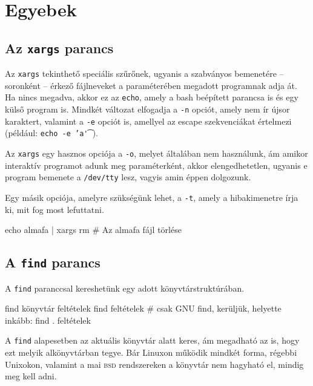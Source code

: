 \chapter{Egyebek}%
\label{cha:others}




\section{Az \texttt{xargs} parancs}

Az \texttt{xargs} tekinthető speciális szűrőnek, ugyanis a szabványos bemenetére
-- soronként -- érkező fájlneveket a paraméterében megadott programnak adja
át. Ha nincs megadva, akkor ez az \texttt{echo}, amely a bash beépített parancsa
is és egy külső program is. Mindkét változat elfogadja a \texttt{-n} opciót,
amely nem ír újsor karaktert, valamint a \texttt{-e} opciót is, amellyel az
escape szekvenciákat értelmezi (például: \texttt{echo -e 'a\t'}).

Az \texttt{xargs} egy hasznos opciója a \texttt{-o}, melyet általában nem
használunk, ám amikor interaktív programot adunk meg paraméterként, akkor
elengedhetetlen, ugyanis e program bemenete a \texttt{/dev/tty} lesz, vagyis
amin éppen dolgozunk.

Egy másik opciója, amelyre szükségünk lehet, a \texttt{-t}, amely a
hibakimenetre írja ki, mit fog most lefuttatni.


\begin{VerbExample}
echo almafa | xargs rm            # Az almafa fájl törlése
\end{VerbExample}




\section{A \texttt{find} parancs}

A \texttt{find} paranccsal kereshetünk egy adott könyvtárstruktúrában.

\begin{VerbExample}
find könyvtár feltételek
find feltételek            # csak GNU find, kerüljük, helyette inkább:
find . feltételek
\end{VerbExample}

A \texttt{find} alapesetben az aktuális könyvtár alatt keres, ám megadható az
is, hogy ezt melyik alkönyvtárban tegye. Bár Linuxon működik mindkét forma,
régebbi Unixokon, valamint a mai \textsc{bsd} rendszereken a könyvtár nem
hagyható el, mindig meg kell adni.

